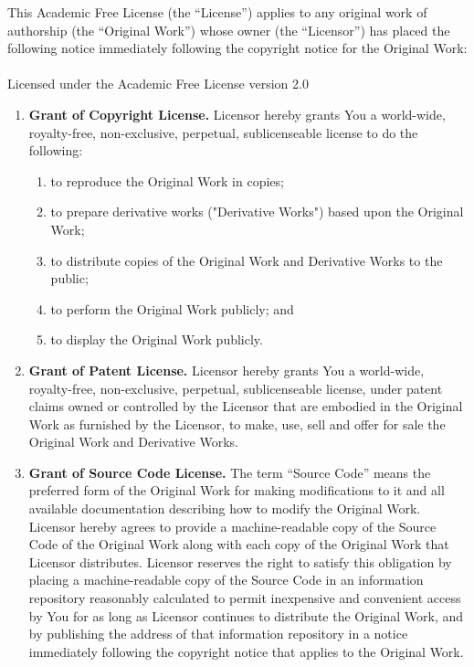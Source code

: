 \documentclass[letterpaper,10pt,titlepage]{custbook}
\begin{document}
\begin{it}
This Academic Free License (the ``License'') applies to any original work of authorship 
(the ``Original Work'') whose owner (the ``Licensor'') has placed the following 
notice immediately following the copyright notice for the Original Work:\\
\\
Licensed under the Academic Free License version 2.0

\begin{enumerate}
\item \textbf{Grant of Copyright License.} Licensor hereby grants You a world-wide, royalty-free, 
      non-exclusive, perpetual, sublicenseable license to do the following:
	  
   \begin{enumerate}
   \item to reproduce the Original Work in copies; 
   \item to prepare derivative works ("Derivative Works") based upon the Original Work; 
   \item to distribute copies of the Original Work and Derivative Works to the public; 
   \item to perform the Original Work publicly; and 
   \item to display the Original Work publicly. 
   \end{enumerate}

\item \textbf{Grant of Patent License.} Licensor hereby grants You a world-wide, royalty-free, non-exclusive, 
      perpetual, sublicenseable license, under patent claims owned or controlled by the Licensor that are embodied 
	  in the Original Work as furnished by the Licensor, to make, use, sell and offer for sale the 
	  Original Work and Derivative Works. 
   	   
\item \textbf{Grant of Source Code License.}  The term ``Source Code'' means the preferred form of the 
      Original Work for making modifications to it and all available documentation describing how to modify the 
	  Original Work. Licensor hereby agrees to provide a machine-readable copy of the Source Code of the 
	  Original Work along with each copy of the Original Work that Licensor distributes. 
	  Licensor reserves the right to satisfy this obligation by placing a machine-readable copy of 
	  the Source Code in an information repository reasonably calculated to permit inexpensive and convenient 
	  access by You for as long as Licensor continues to distribute the Original Work, and by publishing the 
	  address of that information repository in a notice immediately following the copyright 
	  notice that applies to the Original Work. 


\end{enumerate}
\end{it}
\end{document}
